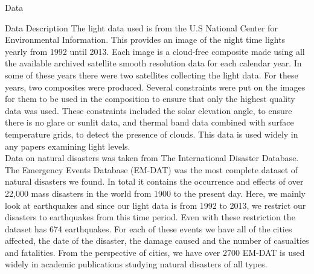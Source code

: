 \documentclass[12.5pt,fleqn,leqno,letterpaper]{article}
\begin{document}
\begin{section}{Data}
  \begin{subsection}{Data Description}
    The light data used is from the U.S National Center for Environmental Information. This provides an image of the night time lights yearly from 1992 until 2013. Each image is a cloud-free composite made using all the available archived satellite smooth resolution data for each calendar year. In some of these years there were two satellites collecting the light data. For these years, two composites were produced. Several constraints were put on the images for them to be used in the composition to ensure that only the highest quality data was used. These constraints included the solar elevation angle, to ensure there is no glare or sunlit data, and thermal band data combined with surface temperature grids, to detect the presence of clouds. This data is used widely in any papers examining light levels. \\
    Data on natural disasters was taken from The International Disaster Database. The Emergency Events Database (EM-DAT) was the most complete dataset of natural disasters we found. In total it contains the occurrence and effects of over 22,000 mass disasters in the world from 1900 to the present day. Here, we mainly look at earthquakes and since our light data is from 1992 to 2013, we restrict our disasters to earthquakes from this time period. Even with these restriction the dataset has 674 earthquakes. For each of these events we have all of the cities affected, the date of the disaster, the damage caused and the number of casualties and fatalities. From the perspective of cities, we have over $2700$ EM-DAT is used widely in academic publications studying natural disasters of all types.
  \end{subsection}


\end{section}
\end{document}
